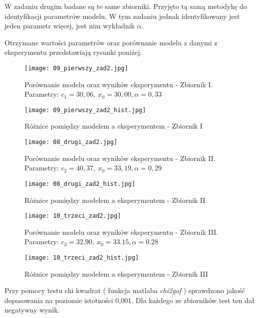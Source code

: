 \documentclass[a4paper,15pt]{article}
\begin{document}
W zadaniu drugim badane są te same zbiorniki. Przyjęto tą samą metodykę do identyfikacji parametrów modelu. W tym zadaniu jednak identyfikowany jest jeden parametr więcej, jest nim wykładnik \( \alpha \).

Otrzymane wartości parametrów oraz porównanie modelu z danymi z eksperymentu przedstawiają rysunki poniżej.

\begin{figure}[H]
\centerline{\texttt{[image: 09\_pierwszy\_zad2.jpg]}}
\centering
\caption{Porównanie modelu oraz wyników eksperymentu - Zbiornik I. Parametry:
\( c_1 = 30,06, \ x_0 = 30,00, \alpha = 0,33 \)}
\label{fig:05_pierwszy_zad1}
\end{figure}

\begin{figure}[H]
\centerline{\texttt{[image: 09\_pierwszy\_zad2\_hist.jpg]}}
\centering
\caption{Różnice pomiędzy modelem a eksperymentem - Zbiornik I}
\label{fig:05_pierwszy_zad1_hist}
\end{figure}

\begin{figure}[H]
\centerline{\texttt{[image: 08\_drugi\_zad2.jpg]}}
\centering
\caption{Porównanie modelu oraz wyników eksperymentu - Zbiornik II. Parametry:
\( c_2 = 40,37, \ x_0 = 33,19, \alpha = 0,29 \)}
\label{fig:03_drugi_zad1}
\end{figure}

\begin{figure}[H]
\centerline{\texttt{[image: 08\_drugi\_zad2\_hist.jpg]}}
\centering
\caption{Różnice pomiędzy modelem a eksperymentem - Zbiornik II}
\label{fig:03_drugi_zad1_hist}
\end{figure}


\begin{figure}[H]
\centerline{\texttt{[image: 10\_trzeci\_zad2.jpg]}}
\centering
\caption{Porównanie modelu oraz wyników eksperymentu - Zbiornik III. Parametry:
\( c_3 = 32.90 , \ x_0 = 33.15, \alpha = 0.28 \)}
\label{fig:04_trzeci_zad1}
\end{figure}

\begin{figure}[H]
\centerline{\texttt{[image: 10\_trzeci\_zad2\_hist.jpg]}}
\centering
\caption{Różnice pomiędzy modelem a eksperymentem - Zbiornik III}
\label{fig:04_trzeci_zad1_hist}
\end{figure}

Przy pomocy testu chi kwadrat ( funkcja matlaba \textit{chi2gof} ) sprawdzono jakość dopasowania na poziomie istotności 0,001. Dla każdego ze zbiorników test ten dał negatywny wynik. 
\end{document}
